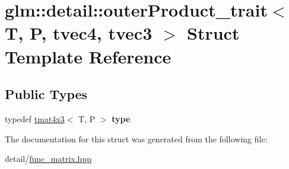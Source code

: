 \hypertarget{structglm_1_1detail_1_1outerProduct__trait_3_01T_00_01P_00_01tvec4_00_01tvec3_01_4}{\section{glm\-:\-:detail\-:\-:outer\-Product\-\_\-trait$<$ T, P, tvec4, tvec3 $>$ Struct Template Reference}
\label{structglm_1_1detail_1_1outerProduct__trait_3_01T_00_01P_00_01tvec4_00_01tvec3_01_4}
}
\subsection*{Public Types}
\begin{DoxyCompactItemize}
\item 
\hypertarget{structglm_1_1detail_1_1outerProduct__trait_3_01T_00_01P_00_01tvec4_00_01tvec3_01_4_ac754af38f5684e757b9fcc70ecaea5c8}{typedef \hyperlink{structglm_1_1tmat4x3}{tmat4x3}$<$ T, P $>$ {\bfseries type}}\label{structglm_1_1detail_1_1outerProduct__trait_3_01T_00_01P_00_01tvec4_00_01tvec3_01_4_ac754af38f5684e757b9fcc70ecaea5c8}

\end{DoxyCompactItemize}


The documentation for this struct was generated from the following file\-:\begin{DoxyCompactItemize}
\item 
detail/\hyperlink{func__matrix_8hpp}{func\-\_\-matrix.\-hpp}\end{DoxyCompactItemize}

